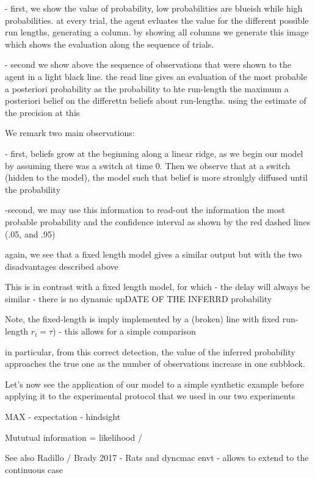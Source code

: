 \documentclass[profile,final,english,draft]{article}%
\begin{document}
- first, we show the value of probability, low probabilities are blueish while high probabilities. at every trial, the agent evluates the value for the different possible run lengths, generating a column. by showing all columns we generate this image which shows the evaluation along the sequence of trials.

- second we show above the sequence of observations that were shown to the agent in a light black line. the read line gives an evaluation of the most probable a posteriori probability as the probability to hte run-length the maximum a posteriori belief on the differettn beliefs about run-lengths. using the estimate of the precision at this

We remark two main observations:

- first, beliefs grow at the beginning along a linear ridge, as we begin our model by assuming there was a switch at time 0. Then we observe that at a switch (hidden to the model), the model
such that belief is more stronlgly diffused until the probability

-second, we may use this information to read-out the information the most probable probability and the confidence interval as shown by the red dashed lines (.05, and .95)

again, we see that a fixed length model gives a similar output
but with the two disadvantages described above

This is in contrast with a fixed length model, for which
- the delay will always be similar
- there is no dynamic upDATE OF THE INFERRD probability

Note, the fixed-length is imply implemented by a (broken) line with fixed run-length $r_t=\tau$) - this allows for a simple comparison


in particular, from this correct detection,
the value of the inferred probability approaches
the true one as the number of observations increase in one subblock.


Let's now see the application of our model to a simple synthetic example before applying it to the experimental protocol that we used in our two experiments

MAX - expectation - hindsight

Mututual information = likelihood /




See also Radillo / Brady 2017 - Rats and dyncmac envt - allows to extend to the continuous case
\end{document}
